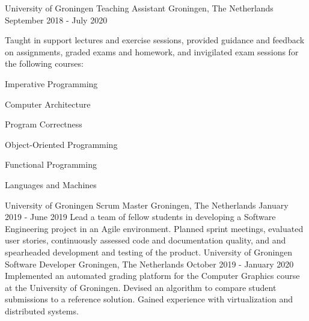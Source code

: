 
\begin{cventries}
	\cventry
	{University of Groningen} %
	{Teaching Assistant} %
	{Groningen, The Netherlands} %
	{September 2018 - July 2020} %
	{
	    Taught in support lectures and exercise sessions, provided guidance and feedback on assignments, graded exams and homework, and invigilated exam sessions for the following courses:
	 \vspace{1.5em}
		\begin{cvitems}
			\item {Imperative Programming}
			\item {Computer Architecture}
			\item {Program Correctness}
			\item {Object-Oriented Programming}
			\item {Functional Programming}
			\item {Languages and Machines}
		\end{cvitems}
	}
	\cventry
	{University of Groningen} %
	{Scrum Master} %
	{Groningen, The Netherlands} %
	{January 2019 - June 2019} %
	{
	    Lead a team of fellow students in developing a Software Engineering project in an Agile environment. Planned sprint meetings, evaluated user stories, continuously assessed code and documentation quality, and and spearheaded development and testing of the product. 
	}\vspace{1em}
	\cventry
	{University of Groningen} %
	{Software Developer} %
	{Groningen, The Netherlands} %
	{October 2019 - January 2020} %
	{
	    Implemented an automated grading platform for the Computer Graphics course at the University of Groningen. Devised an algorithm to compare student submissions to a reference solution. Gained experience with virtualization and distributed systems.
	}
\end{cventries}
